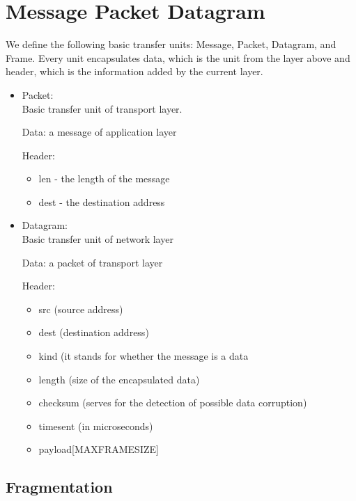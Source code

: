 \documentclass{book}
\begin{document}
\section{Message Packet Datagram}



We define the following basic transfer units: Message, Packet, Datagram, and
Frame. Every unit encapsulates data, which is the unit from the layer above and
header, which is the information added by the current layer. 

\begin{itemize}
  
  \item Packet: \\
  Basic transfer unit of transport layer. 
  
    Data:  a message of application layer
  
    Header:  
  \begin{itemize}
    \item len - the length of the message
    \item dest - the destination address
    \end{itemize}
  
  \item Datagram: \\
   Basic transfer unit of network layer
   
     Data: a packet of transport layer
   
     Header: 
   \begin{itemize}
     \item src (source address)
     \item dest (destination address)
     \item kind (it stands for whether the message is a data 
     \item length (size of the encapsulated data)
     \item checksum (serves for the detection of possible data corruption)
     \item timesent (in microseconds)
     \item payload[MAXFRAMESIZE]
\end{itemize}

 \end{itemize}

\subsection{Fragmentation}
\end{document}
